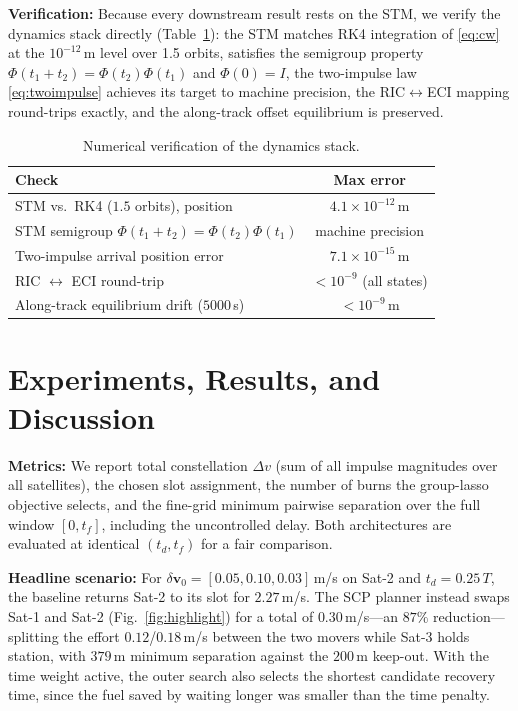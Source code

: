 \documentclass[10pt,twocolumn,letterpaper]{article}
\begin{document}
\textbf{Verification:} Because every downstream result rests on the STM, we
verify the dynamics stack directly (Table~\ref{tab:verification}): the STM
matches RK4 integration of \eqref{eq:cw} at the $10^{-12}$\,m level over 1.5
orbits, satisfies the semigroup property
$\Phi(t_1{+}t_2) = \Phi(t_2)\Phi(t_1)$ and $\Phi(0) = I$, the two-impulse law
\eqref{eq:twoimpulse} achieves its target to machine precision, the
RIC$\leftrightarrow$ECI mapping round-trips exactly, and the along-track
offset equilibrium is preserved.

\begin{table}[t]
\centering
\caption{Numerical verification of the dynamics stack.}
\label{tab:verification}
\small
\begin{tabular}{@{}lc@{}}
\toprule
\textbf{Check} & \textbf{Max error} \\
\midrule
STM vs.\ RK4 ($1.5$ orbits), position & $4.1\times10^{-12}$\,m \\
STM semigroup $\Phi(t_1{+}t_2) = \Phi(t_2)\Phi(t_1)$ & machine precision \\
Two-impulse arrival position error & $7.1\times10^{-15}$\,m \\
RIC $\leftrightarrow$ ECI round-trip & $<10^{-9}$ (all states) \\
Along-track equilibrium drift ($5000$\,s) & $<10^{-9}$\,m \\
\bottomrule
\end{tabular}
\end{table}

\section{Experiments, Results, and Discussion}
\label{sec:experiments}

\textbf{Metrics:} We report total constellation $\Delta v$ (sum of all
impulse magnitudes over all satellites), the chosen slot assignment, the
number of burns the group-lasso objective selects, and the fine-grid minimum
pairwise separation over the full window $[0, t_f]$, including the
uncontrolled delay. Both architectures are evaluated at identical $(t_d, t_f)$
for a fair comparison.

\textbf{Headline scenario:} For $\delta\mathbf{v}_0 = [0.05, 0.10,
0.03]$\,m/s on Sat-2 and $t_d = 0.25\,T$, the baseline returns Sat-2 to its
slot for $2.27$\,m/s. The SCP planner instead swaps Sat-1 and Sat-2
(Fig.~\ref{fig:highlight}) for a total of $0.30$\,m/s---an $87\%$
reduction---splitting the effort $0.12$/$0.18$\,m/s between the two movers
while Sat-3 holds station, with $379$\,m minimum separation against the
$200$\,m keep-out. With the time weight active, the outer search also selects
the shortest candidate recovery time, since the fuel saved by waiting longer
was smaller than the time penalty.
\end{document}
